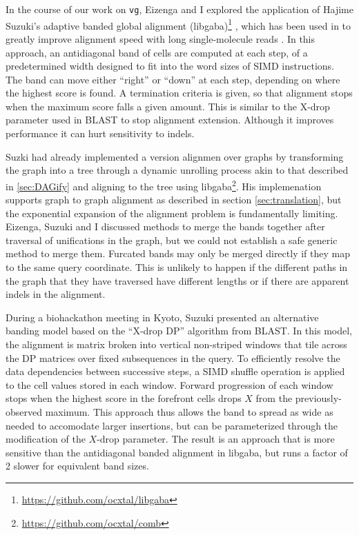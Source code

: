 In the course of our work on {\tt vg}, Eizenga and I explored the application of Hajime Suzuki's adaptive banded global alignment (libgaba)\footnote{\url{https://github.com/ocxtal/libgaba}} \cite{suzuki2017acceleration}, which has been used in to greatly improve alignment speed with long single-molecule reads \cite{li2018minimap2}.
In this approach, an antidiagonal band of cells are computed at each step, of a predetermined width designed to fit into the word sizes of SIMD instructions.
The band can move either ``right'' or ``down'' at each step, depending on where the highest score is found.
A termination criteria is given, so that alignment stops when the maximum score falls a given amount.
This is similar to the X-drop parameter used in BLAST to stop alignment extension.
Although it improves performance it can hurt sensitivity to indels.

Suzki had already implemented a version alignmen over graphs by transforming the graph into a tree through a dynamic unrolling process akin to that described in \ref{sec:DAGify} and aligning to the tree using libgaba\footnote{\url{https://github.com/ocxtal/comb}}.
His implemenation supports graph to graph alignment as described in section \ref{sec:translation}, but the exponential expansion of the alignment problem is fundamentally limiting.
Eizenga, Suzuki and I discussed methods to merge the bands together after traversal of unifications in the graph, but we could not establish a safe generic method to merge them.
Furcated bands may only be merged directly if they map to the same query coordinate.
This is unlikely to happen if the different paths in the graph that they have traversed have different lengths or if there are apparent indels in the alignment.

During a biohackathon meeting in Kyoto, Suzuki presented an alternative banding model based on the ``X-drop DP'' algorithm from BLAST.
In this model, the alignment is matrix broken into vertical non-striped windows that tile across the DP matrices over fixed subsequences in the query.
To efficiently resolve the data dependencies between successive steps, a SIMD shuffle operation is applied to the cell values stored in each window.
Forward progression of each window stops when the highest score in the forefront cells drops $X$ from the previously-observed maximum.
This approach thus allows the band to spread as wide as needed to accomodate larger insertions, but can be parameterized through the modification of the $X$-drop parameter.
The result is an approach that is more sensitive than the antidiagonal banded alignment in libgaba, but runs a factor of 2 slower for equivalent band sizes.

